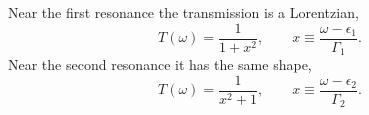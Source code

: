 \documentclass{article}
\begin{document}
Near the first resonance the transmission is a Lorentzian,
\begin{equation}
T(\omega) = \frac{1}{1+x^2}, \qquad x \equiv \frac{\omega-\epsilon_1}{\Gamma_1} .
\label{eq:t1}
\end{equation}
Near the second resonance it has the same shape,
\begin{equation}
T(\omega) = \frac{1}{x^2+1}, \qquad x \equiv \frac{\omega-\epsilon_2}{\Gamma_2} .
\label{eq:t2}
\end{equation}
\end{document}
